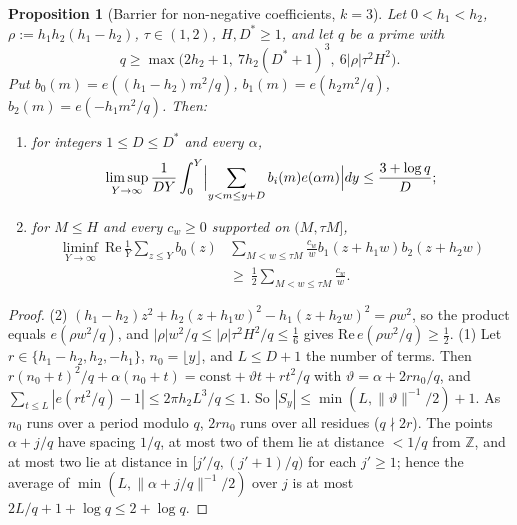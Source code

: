 \documentclass[preprint,12pt]{elsarticle}
\numberwithin{equation}{section}
\theoremstyle{plain}
\newtheorem{proposition}[theorem]{Proposition}
\theoremstyle{definition}
\theoremstyle{definition}
\theoremstyle{remark}
\begin{document}
\begin{proposition}[Barrier for non-negative coefficients, $k=3$]
\label{prop:barrier_pos}
Let $0<h_1<h_2$, $\rho:=h_1h_2(h_1-h_2)$, $\tau\in(1,2)$, $H,D^*\ge1$, and let $q$ be a prime with
\begin{equation}
q\ge\max\bigl(2h_2+1,\ 7h_2(D^*+1)^3,\ 6|\rho|\tau^2H^2\bigr).
\label{eq:q_choice}
\end{equation}
Put $b_0(m)=e((h_1-h_2)m^2/q)$, $b_1(m)=e(h_2m^2/q)$, $b_2(m)=e(-h_1m^2/q)$. Then:
\begin{enumerate}
\item for integers $1\le D\le D^*$ and every $\alpha$,
\begin{equation}
\limsup_{Y\to\infty}\frac1{DY}\int_0^Y\Bigl|\sum_{y<m\le y+D}b_i(m)e(\alpha m)\Bigr|dy\le\frac{3+\log q}{D};
\label{eq:barrier_pos_127}
\end{equation}
\item for $M\le H$ and every $c_w\ge0$ supported on $(M,\tau M]$,
\begin{equation}
\begin{aligned}
\liminf_{Y\to\infty}\ \mathrm{Re}\,\frac1Y\sum_{z\le Y}b_0(z)&\sum_{M<w\le\tau M}\frac{c_w}{w}b_1(z+h_1w)b_2(z+h_2w)\\
&\ge\ \frac12\sum_{M<w\le\tau M}\frac{c_w}{w}.
\end{aligned}
\label{eq:barrier_pos}
\end{equation}
\end{enumerate}
\end{proposition}

\begin{proof}
(2) $(h_1-h_2)z^2+h_2(z+h_1w)^2-h_1(z+h_2w)^2=\rho w^2$, so the product equals $e(\rho w^2/q)$, and $|\rho|w^2/q\le|\rho|\tau^2H^2/q\le\frac16$ gives $\mathrm{Re}\,e(\rho w^2/q)\ge\frac12$. (1) Let $r\in\{h_1-h_2,h_2,-h_1\}$, $n_0=\lfloor y\rfloor$, and $L\le D+1$ the number of terms. Then $r(n_0+t)^2/q+\alpha(n_0+t)=\mathrm{const}+\vartheta t+rt^2/q$ with $\vartheta=\alpha+2rn_0/q$, and $\sum_{t\le L}|e(rt^2/q)-1|\le2\pi h_2L^3/q\le1$. So $|S_y|\le\min(L,\|\vartheta\|^{-1}/2)+1$. As $n_0$ runs over a period modulo $q$, $2rn_0$ runs over all residues ($q\nmid2r$). The points $\alpha+j/q$ have spacing $1/q$, at most two of them lie at distance $<1/q$ from $\mathbb Z$, and at most two lie at distance in $[j'/q,(j'+1)/q)$ for each $j'\ge1$; hence the average of $\min(L,\|\alpha+j/q\|^{-1}/2)$ over $j$ is at most $2L/q+1+\log q\le2+\log q$.
\end{proof}
\end{document}
